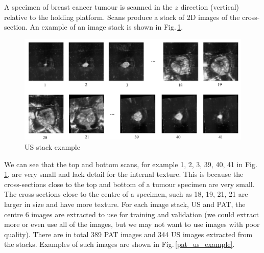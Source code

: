 A specimen of breast cancer tumour is scanned in the $z$ direction (vertical) relative to the holding platform. Scans produce a stack of 2D images of the cross-section. An example of an image stack is shown in Fig.\,\ref{stack}. 

\begin{figure}[h]
	\centering
	\includegraphics[width=\textwidth]{Figs/pat_stack_50.jpg}
    \caption{US stack example}
    \label{stack}
\end{figure}

We can see that the top and bottom scans, for example 1, 2, 3, 39, 40, 41 in Fig.\,\ref{stack}, are very small and lack detail for the internal texture. This is because the cross-sections close to the top and bottom of a tumour specimen are very small. The cross-sections close to the centre of a specimen, such as 18, 19, 21, 21 are larger in size and have more texture. For each image stack, US and PAT, the centre 6 images are extracted to use for training and validation (we could extract more or even use all of the images, but we may not want to use images with poor quality). There are in total 389 PAT images and 344 US images extracted from the stacks. Examples of such images are shown in Fig.\,\ref{pat_us_example}.

